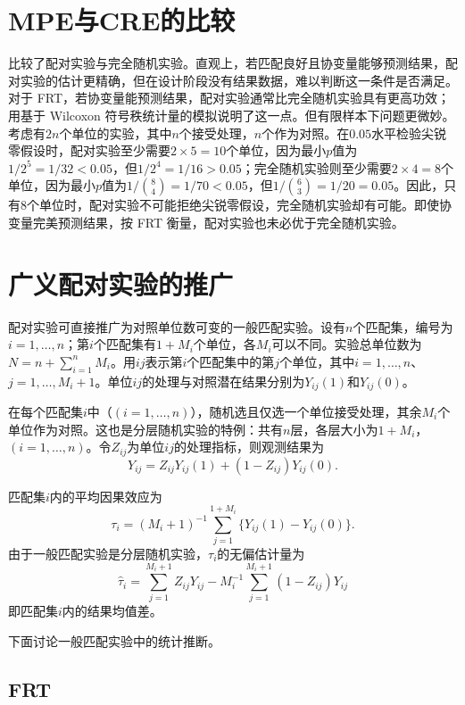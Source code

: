 \section{MPE与CRE的比较}
\label{sec::discussion}

\citet{imai2008variance}比较了配对实验与完全随机实验。直观上，若匹配良好且协变量能够预测结果，配对实验的估计更精确，但在设计阶段没有结果数据，难以判断这一条件是否满足。对于 FRT，若协变量能预测结果，配对实验通常比完全随机实验具有更高功效；\citet{greevy2004optimal}用基于 Wilcoxon 符号秩统计量的模拟说明了这一点。但有限样本下问题更微妙。考虑有$2n$个单位的实验，其中$n$个接受处理，$n$个作为对照。在$0.05$水平检验尖锐零假设时，配对实验至少需要$2\times 5=10$个单位，因为最小$p$值为$1/2^5 = 1/32 < 0.05$，但$1/2^4 = 1/16 > 0.05$；完全随机实验则至少需要$2\times 4 = 8$个单位，因为最小$p$值为$1/\binom{8}{4} = 1/70 < 0.05$，但$1/\binom{6}{3} = 1/20 = 0.05$。因此，只有$8$个单位时，配对实验不可能拒绝尖锐零假设，完全随机实验却有可能。即使协变量完美预测结果，按 FRT 衡量，配对实验也未必优于完全随机实验。 



\section{广义配对实验的推广}\label{sec::general-matched-experiment}

配对实验可直接推广为对照单位数可变的一般匹配实验。设有$n$个匹配集，编号为$i=1, \ldots, n$；第$i$个匹配集有$1+M_i$个单位，各$M_i$可以不同。实验总单位数为$N = n + \sum_{i=1}^n M_i$。用$ij$表示第$i$个匹配集中的第$j$个单位，其中$i=1,\ldots, n$、$j=1,\ldots, M_i+1$。单位$ij$的处理与对照潜在结果分别为$Y_{ij}(1)$和$Y_{ij}(0)$。 


在每个匹配集$i$中（$(i=1, \ldots, n)$），随机选且仅选一个单位接受处理，其余$M_i$个单位作为对照。这也是分层随机实验的特例：共有$n$层，各层大小为$1+M_i$，$(i=1, \ldots, n)$。令$Z_{ij}$为单位$ij$的处理指标，则观测结果为
$$
Y_{ij} = Z_{ij} Y_{ij}(1) + (1-Z_{ij}) Y_{ij}(0) . 
$$ 

匹配集$i$内的平均因果效应为
$$
\tau_i = (M_i + 1)^{-1} \sum_{j=1}^{1+M_i} \{ Y_{ij}(1)-Y_{ij}(0) \}. 
$$
由于一般匹配实验是分层随机实验，$\tau_i $的无偏估计量为
$$
\hat \tau_i = \sum_{j=1}^{M_i + 1} Z_{ij} Y_{ij} - M_i^{-1} \sum_{j=1}^{M_i+1} (1-Z_{ij}) Y_{ij}
$$
即匹配集$i$内的结果均值差。 

下面讨论一般匹配实验中的统计推断。 


\subsection{FRT}

